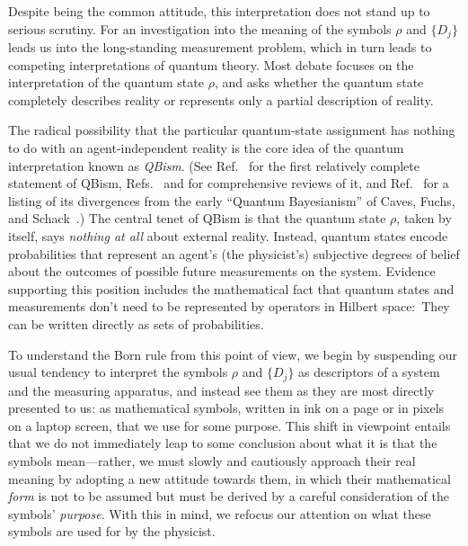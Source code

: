 \documentclass[%
 reprint,superscriptaddress,
 amsmath,amssymb,
 aps,twocolumn,pra
]{revtex4-1}
\newcommand{\tit}[1]{\textit{#1}}
\begin{document}
Despite being the common attitude, this interpretation does not stand up to serious scrutiny. For an investigation into the meaning of the symbols $\rho$ and $\{ D_j \}$ leads us into the long-standing measurement problem, which in turn leads to competing interpretations of quantum theory. Most debate focuses on the interpretation of the quantum state $\rho$, and asks whether the quantum state completely describes reality or represents only a partial description of reality.

The radical possibility that the particular quantum-state assignment has nothing to do with an agent-independent reality is the core idea of the quantum interpretation known as \tit{QBism}. (See Ref.~\cite{Fuchs10a} for the first relatively complete statement of QBism, Refs.\ \cite{FuchsStacey2018} and \cite{FMS} for comprehensive reviews of it, and Ref.~\cite{Stacey2019} for a listing of its divergences from the early ``Quantum Bayesianism'' of Caves, Fuchs, and Schack~\cite{Caves02a}.) The central tenet of QBism is that the quantum state $\rho$, taken by itself, says \tit{nothing at all} about external reality. Instead, quantum states encode probabilities that represent an agent's (the physicist's) subjective degrees of belief about the outcomes of possible future measurements on the system.  Evidence supporting this position includes the mathematical fact that quantum states and measurements don't need to be represented by operators in Hilbert space:\ They can be written directly as sets of probabilities.

To understand the Born rule from this point of view, we begin by suspending our usual tendency to interpret the symbols $\rho$ and $\{ D_j \}$ as  descriptors of a system and the measuring apparatus, and instead see them as they are most directly presented to us: as mathematical symbols, written in ink on a page or in pixels on a laptop screen, that we use for some purpose. This shift in viewpoint entails that we do not immediately leap to some conclusion about what it is that the symbols mean---rather, we must slowly and cautiously approach their real meaning by adopting a new attitude towards them, in which their mathematical \tit{form} is not to be assumed but must be derived by a careful consideration of the symbols' \tit{purpose}. With this in mind, we refocus our attention on what these symbols are used for by the physicist.
\end{document}

